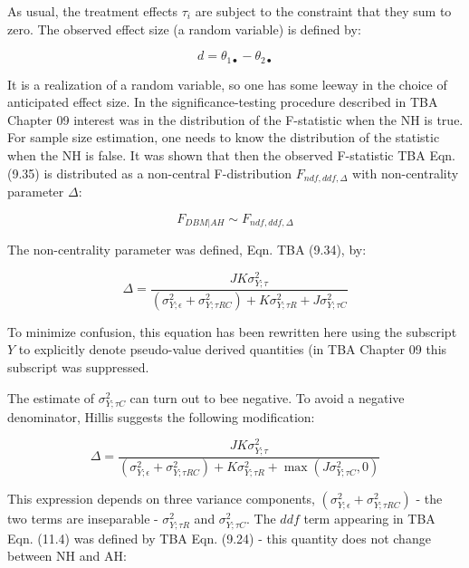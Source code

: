 \documentclass[
]{book}
\begin{document}
As usual, the treatment effects \(\tau_i\) are subject to the constraint that they sum to zero. The observed effect size (a random variable) is defined by:

\begin{equation}
d=\theta_{1\bullet}-\theta_{2\bullet}
\label{eq:EffectSize1}
\end{equation}

It is a realization of a random variable, so one has some leeway in the choice of anticipated effect size. In the significance-testing procedure described in TBA Chapter 09 interest was in the distribution of the F-statistic when the NH is true. For sample size estimation, one needs to know the distribution of the statistic when the NH is false. It was shown that then the observed F-statistic TBA Eqn. (9.35) is distributed as a non-central F-distribution \(F_{ndf,ddf,\Delta}\) with non-centrality parameter \(\Delta\):

\begin{equation}
F_{DBM|AH} \sim F_{ndf,ddf,\Delta}
\label{eq:FDBMSampling1}
\end{equation}

The non-centrality parameter was defined, Eqn. TBA (9.34), by:

\begin{equation}
\Delta=\frac{JK\sigma_{Y;\tau}^2}{\left ( \sigma_{Y;\epsilon}^2 + \sigma_{Y;\tau RC}^2 \right )+K\sigma_{Y;\tau R}^2+J\sigma_{Y;\tau C}^2}
\label{eq:DefDelta1}
\end{equation}

To minimize confusion, this equation has been rewritten here using the subscript \(Y\) to explicitly denote pseudo-value derived quantities (in TBA Chapter 09 this subscript was suppressed.

The estimate of \(\sigma_{Y;\tau C}^2\) can turn out to bee negative. To avoid a negative denominator, Hillis suggests the following modification:

\begin{equation}
\Delta=\frac{JK\sigma_{Y;\tau}^2}{\left ( \sigma_{Y;\epsilon}^2 + \sigma_{Y;\tau RC}^2 \right )+K\sigma_{Y;\tau R}^2+\max \left (J\sigma_{Y;\tau C}^2 ,0 \right )}
\label{eq:DefDeltaHillis1}
\end{equation}

This expression depends on three variance components, \((\sigma_{Y;\epsilon}^2 + \sigma_{Y;\tau RC}^2)\) - the two terms are inseparable - \(\sigma_{Y;\tau R}^2\) and \(\sigma_{Y;\tau C}^2\). The \(ddf\) term appearing in TBA Eqn. (11.4) was defined by TBA Eqn. (9.24) - this quantity does not change between NH and AH:
\end{document}
